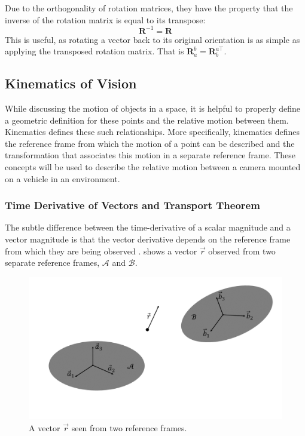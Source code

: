 \documentclass{UoNMCHA}
\numberwithin{equation}{section}
\begin{document}
Due to the orthogonality of rotation matrices, they have the property that the inverse of the rotation matrix is equal to its transpose:
\begin{equation}
	\mathbf{R}^{-1} = \mathbf{R}
\end{equation}
This is useful, as rotating a vector back to its original orientation is as simple as applying the transposed rotation matrix. That is $\mathbf{R}^{b}_{a} = \mathbf{R}^{a\top}_{b}$.
\subsection{Kinematics of Vision}
While discussing the motion of objects in a space, it is helpful to properly define a geometric definition for these points and the relative motion between them. Kinematics defines these such relationships. More specifically, kinematics defines the reference frame from which the motion of a point can be described and the transformation that associates this motion in a separate reference frame. These concepts will be used to describe the relative motion between a camera mounted on a vehicle in an environment.

\subsubsection{Time Derivative of Vectors and Transport Theorem}\label{sec:VectorDerivitives}
The subtle difference between the time-derivative of a scalar magnitude and a vector magnitude is that the vector derivative depends on the reference frame from which they are being observed \cite{3900Notes}.  shows a vector $\vec{r}$ observed from two separate reference frames, $\mathcal{A}$ and $\mathcal{B}$.

\begin{figure}[ht]
    \begin{center}
        \includegraphics[width=.8\linewidth]{Figures/vectorDerivitive}
        \caption{A vector $\vec{r}$ seen from two reference frames.}
        \label{fig:vectorDerivitive}
    \end{center}
\end{figure}
\end{document}
